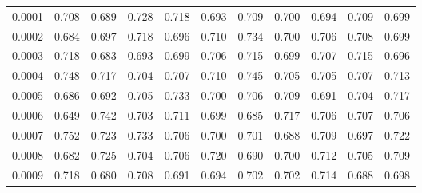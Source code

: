 \begin{table}[H]
\begin{tabular}{rrrrrrrrrrr}
0.0001                     & 0.708                & 0.689                & 0.728                & 0.718                & 0.693                & 0.709                & 0.700                & 0.694                & 0.709                & 0.699                \\
0.0002                     & 0.684                & 0.697                & 0.718                & 0.696                & 0.710                & 0.734                & 0.700                & 0.706                & 0.708                & 0.699                \\
0.0003                     & 0.718                & 0.683                & 0.693                & 0.699                & 0.706                & 0.715                & 0.699                & 0.707                & 0.715                & 0.696                \\
0.0004                     & 0.748                & 0.717                & 0.704                & 0.707                & 0.710                & 0.745                & 0.705                & 0.705                & 0.707                & 0.713                \\
0.0005                     & 0.686                & 0.692                & 0.705                & 0.733                & 0.700                & 0.706                & 0.709                & 0.691                & 0.704                & 0.717                \\
0.0006                     & 0.649                & 0.742                & 0.703                & 0.711                & 0.699                & 0.685                & 0.717                & 0.706                & 0.707                & 0.706                \\
0.0007                     & 0.752                & 0.723                & 0.733                & 0.706                & 0.700                & 0.701                & 0.688                & 0.709                & 0.697                & 0.722                \\
0.0008                     & 0.682                & 0.725                & 0.704                & 0.706                & 0.720                & 0.690                & 0.700                & 0.712                & 0.705                & 0.709                \\
0.0009                     & 0.718                & 0.680                & 0.708                & 0.691                & 0.694                & 0.702                & 0.702                & 0.714                & 0.688                & 0.698          \\ \hline       
\end{tabular}
\label{tabla100_10000}
\end{table}

